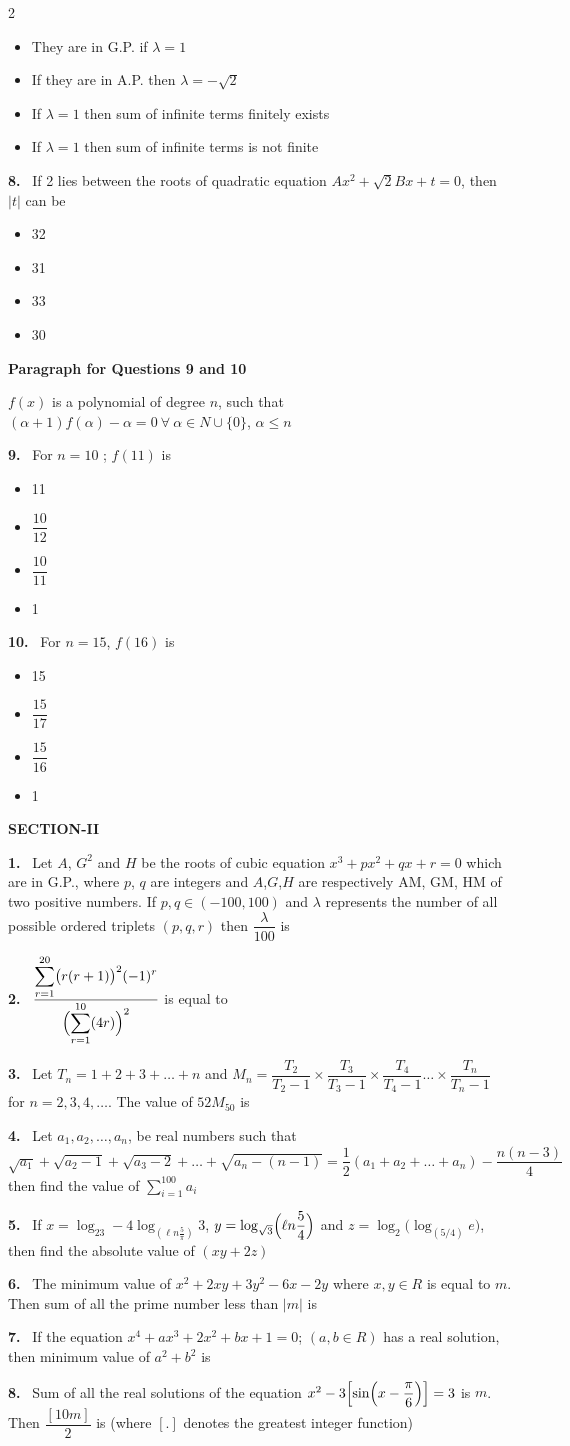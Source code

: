 \documentclass[10pt]{extarticle}
\newcommand{\sect}[1]{\par\smallskip\noindent\textbf{#1}\par}
\newcommand{\qn}[1]{\par\smallskip\noindent\textbf{#1.}~}
\newcommand{\paraq}[2]{\par\smallskip\noindent\textbf{Paragraph for Questions #1 and #2}\par}
\newenvironment{qoptions}{\begin{itemize}[leftmargin=1.8em,itemsep=1pt,topsep=2pt,label={}]}{\end{itemize}}
\newcommand{\opt}[2]{\item[(#1)] #2}
\begin{document}
\begin{multicols}{2}
\begin{qoptions}
\opt{A}{They are in G.P. if $\lambda=1$}
\opt{B}{If they are in A.P. then $\lambda=-\sqrt2$}
\opt{C}{If $\lambda=1$ then sum of infinite terms finitely exists}
\opt{D}{If $\lambda=1$ then sum of infinite terms is not finite}
\end{qoptions}
\qn{8} If 2 lies between the roots of quadratic equation $Ax^2+\sqrt2Bx+t=0$, then $|t|$ can be
\begin{qoptions}
\opt{A}{32}
\opt{B}{31}
\opt{C}{33}
\opt{D}{30}
\end{qoptions}
\paraq{9}{10}
$f(x)$ is a polynomial of degree $n$, such that $(\alpha+1)f(\alpha)-\alpha=0\ \forall\ \alpha\in N\cup\{0\}$, $\alpha\le n$
\qn{9} For $n=10$ ; $f(11)$ is
\begin{qoptions}
\opt{A}{11}
\opt{B}{$\dfrac{10}{12}$}
\opt{C}{$\dfrac{10}{11}$}
\opt{D}{1}
\end{qoptions}
\qn{10} For $n=15$, $f(16)$ is
\begin{qoptions}
\opt{A}{15}
\opt{B}{$\dfrac{15}{17}$}
\opt{C}{$\dfrac{15}{16}$}
\opt{D}{1}
\end{qoptions}
\sect{SECTION-II}
\qn{1} Let $A$, $G^2$ and $H$ be the roots of cubic equation $x^3+px^2+qx+r=0$ which are in G.P., where $p$, $q$ are integers and $A$,$G$,$H$ are respectively AM, GM, HM of two positive numbers. If $p,q\in(-100,100)$ and $\lambda$ represents the number of all possible ordered triplets $(p,q,r)$ then $\dfrac\lambda{100}$ is
\qn{2} $\dfrac{\displaystyle\sum_{r=1}^{20}\bigl(r(r+1)\bigr)^2(-1)^r}{\Bigl(\displaystyle\sum_{r=1}^{10}(4r)\Bigr)^2}$ is equal to
\qn{3} Let $T_n=1+2+3+\ldots+n$ and $M_n=\dfrac{T_2}{T_2-1}\times\dfrac{T_3}{T_3-1}\times\dfrac{T_4}{T_4-1}\ldots\times\dfrac{T_n}{T_n-1}$ for $n=2,3,4,\ldots$. The value of $52M_{50}$ is
\qn{4} Let $a_1,a_2,\ldots,a_n$, be real numbers such that\\
$\sqrt{a_1}+\sqrt{a_2-1}+\sqrt{a_3-2}+\ldots+\sqrt{a_n-(n-1)}=\dfrac12(a_1+a_2+\ldots+a_n)-\dfrac{n(n-3)}4$\\
then find the value of $\displaystyle\sum_{i=1}^{100}a_i$
\qn{5} If $x=\log_23-4\log_{\left(\ell n\frac5\pi\right)}3$, $y=\log_{\sqrt3}\Bigl(\ell n\dfrac54\Bigr)$ and $z=\log_2\bigl(\log_{(5/4)}e\bigr)$, then find the absolute value of $(xy+2z)$
\qn{6} The minimum value of $x^2+2xy+3y^2-6x-2y$ where $x,y\in R$ is equal to $m$. Then sum of all the prime number less than $|m|$ is
\qn{7} If the equation $x^4+ax^3+2x^2+bx+1=0$; $(a,b\in R)$ has a real solution, then minimum value of $a^2+b^2$ is
\qn{8} Sum of all the real solutions of the equation $x^2-3\Bigl[\sin\Bigl(x-\dfrac\pi6\Bigr)\Bigr]=3$ is $m$. Then $\dfrac{[10m]}2$ is (where $[.]$ denotes the greatest integer function)

\end{multicols}
\end{document}
